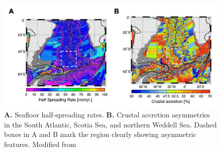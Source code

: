 \documentclass[letterpaper,12pt,notitle]{memphisthesis}                     %
\begin{document}
\begin{figure}[!htb]
	\centering
	\includegraphics[width=0.9\linewidth,trim=4 4 4 4,clip]{./figs/hsr_muller.png}
	\caption{\textbf{A.} Seafloor half-spreading rates. \textbf{B.} Crustal accretion asymmetries in the South Atlantic, Scotia Sea, and northern Weddell Sea. Dashed boxes in A and B mark the region clearly showing asymmetric features. Modified from \citet{Muller2008}}
	\label{fig:hsr_muller}
\end{figure}
\end{document}
